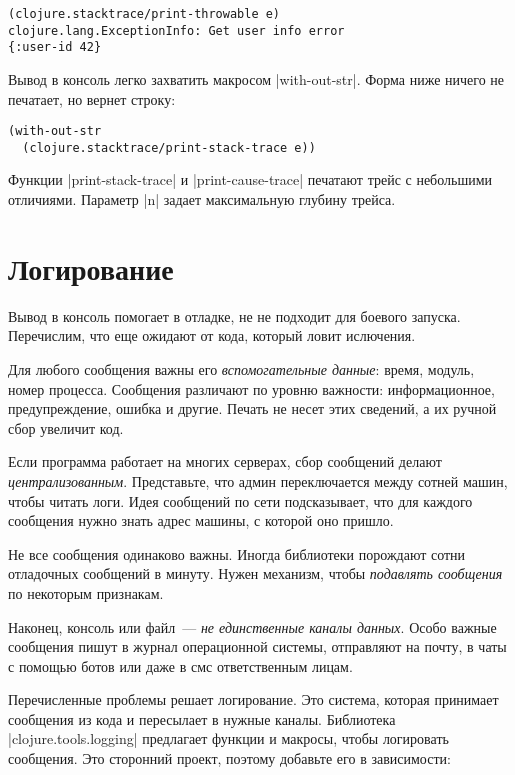 \begin{verbatim}
(clojure.stacktrace/print-throwable e)
clojure.lang.ExceptionInfo: Get user info error
{:user-id 42}
\end{verbatim}

Вывод в консоль легко захватить макросом \spverb|with-out-str|. Форма ниже
ничего не печатает, но вернет строку:

\begin{verbatim}
(with-out-str
  (clojure.stacktrace/print-stack-trace e))
\end{verbatim}

Функции \spverb|print-stack-trace| и \spverb|print-cause-trace| печатают трейс с
небольшими отличиями. Параметр \spverb|n| задает максимальную глубину трейса.

\section{Логирование}

Вывод в консоль помогает в отладке, не не подходит для боевого
запуска. Перечислим, что еще ожидают от кода, который ловит ислючения.

Для любого сообщения важны его \emph{вспомогательные данные}: время, модуль,
номер процесса. Сообщения различают по уровню важности: информационное,
предупреждение, ошибка и другие. Печать не несет этих сведений, а их ручной сбор
увеличит код.

Если программа работает на многих серверах, сбор сообщений делают
\emph{централизованным}. Представьте, что админ переключается между сотней
машин, чтобы читать логи. Идея сообщений по сети подсказывает, что для каждого
сообщения нужно знать адрес машины, с которой оно пришло.

Не все сообщения одинаково важны. Иногда библиотеки порождают сотни отладочных
сообщений в минуту. Нужен механизм, чтобы \emph{подавлять сообщения} по
некоторым признакам.

Наконец, консоль или файл~--- \emph{не единственные каналы данных}. Особо важные
сообщения пишут в журнал операционной системы, отправляют на почту, в чаты с
помощью ботов или даже в смс ответственным лицам.

Перечисленные проблемы решает логирование. Это система, которая принимает
сообщения из кода и пересылает в нужные каналы. Библиотека
\spverb|clojure.tools.logging| предлагает функции и макросы, чтобы логировать
сообщения. Это сторонний проект, поэтому добавьте его в зависимости:

